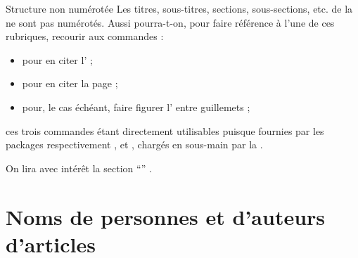 \documentclass{letgut}
\begin{document}
\begin{dbremark}{Structure non numérotée}{}
  Les titres, sous-titres, sections, sous-sections, etc. de la  ne sont
  pas numérotés. Aussi pourra-t-on, pour faire référence à l'une de ces
  rubriques, recourir aux commandes :
  \begin{itemize}
  \item {} pour en citer l' ;
  \item {} pour en citer la page ;
  \item {} pour, le cas échéant, faire figurer
    l' entre guillemets ;
  \end{itemize}
  ces trois commandes étant directement utilisables puisque fournies par les
  packages respectivement ,  et
  , chargés en sous-main par la .
\end{dbremark}

\begin{ltx-code-result}[title addon=références croisées aux rubriques,listing options app={deletekeywords={[3]{nameref,section}}}]
On lira avec intérêt la section \enquote{}
.
\end{ltx-code-result}

\section[Personnes et auteurs]{Noms de personnes et d'auteurs d'articles}
\label{sec:sign-des-articl}

\end{document}
